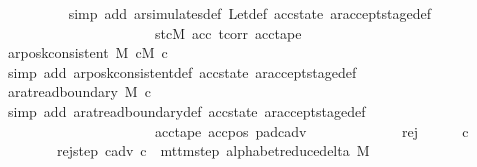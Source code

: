 \begin{isabellebody}
\ \ \ \ \ \ \ \ \isamarkupfalse%
\ {\isacharparenleft}{\kern0pt}simp\ add{\isacharcolon}{\kern0pt}\ ar{\isacharunderscore}{\kern0pt}simulates{\isacharunderscore}{\kern0pt}def\ Let{\isacharunderscore}{\kern0pt}def\ acc{\isacharunderscore}{\kern0pt}state\ ar{\isacharunderscore}{\kern0pt}accept{\isacharunderscore}{\kern0pt}stage{\isacharunderscore}{\kern0pt}def\isanewline
\ \ \ \ \ \ \ \ \ \ \ \ \ \ \ \ \ \ \ \ \ \ st{\isacharunderscore}{\kern0pt}cM{}\ acc\ tcorr{\isacharunderscore}{\kern0pt}{}\ acc{\isacharunderscore}{\kern0pt}tape{\isacharparenright}{\kern0pt}\isanewline
\ \ \ \ \ \ \isamarkupfalse%
\ {\isachardoublequoteopen}ar{\isacharunderscore}{\kern0pt}posk{\isacharunderscore}{\kern0pt}consistent\ M\ cM{\isacharunderscore}{\kern0pt}{}\ c{\isacharprime}{\kern0pt}{\isacharprime}{\kern0pt}{\isachardoublequoteclose}\isanewline
\ \ \ \ \ \ \ \ \isamarkupfalse%
\ {\isacharparenleft}{\kern0pt}simp\ add{\isacharcolon}{\kern0pt}\ ar{\isacharunderscore}{\kern0pt}posk{\isacharunderscore}{\kern0pt}consistent{\isacharunderscore}{\kern0pt}def\ acc{\isacharunderscore}{\kern0pt}state\ ar{\isacharunderscore}{\kern0pt}accept{\isacharunderscore}{\kern0pt}stage{\isacharunderscore}{\kern0pt}def{\isacharparenright}{\kern0pt}\isanewline
\ \ \ \ \ \ \isamarkupfalse%
\ {\isachardoublequoteopen}ar{\isacharunderscore}{\kern0pt}at{\isacharunderscore}{\kern0pt}read{\isacharunderscore}{\kern0pt}boundary\ M\ c{\isacharprime}{\kern0pt}{\isacharprime}{\kern0pt}{\isachardoublequoteclose}\isanewline
\ \ \ \ \ \ \ \ \isamarkupfalse%
\ {\isacharparenleft}{\kern0pt}simp\ add{\isacharcolon}{\kern0pt}\ ar{\isacharunderscore}{\kern0pt}at{\isacharunderscore}{\kern0pt}read{\isacharunderscore}{\kern0pt}boundary{\isacharunderscore}{\kern0pt}def\ acc{\isacharunderscore}{\kern0pt}state\ ar{\isacharunderscore}{\kern0pt}accept{\isacharunderscore}{\kern0pt}stage{\isacharunderscore}{\kern0pt}def\isanewline
\ \ \ \ \ \ \ \ \ \ \ \ \ \ \ \ \ \ \ \ \ \ acc{\isacharunderscore}{\kern0pt}tape\ acc{\isacharunderscore}{\kern0pt}pos\ pad{\isacharunderscore}{\kern0pt}cadv{\isacharparenright}{\kern0pt}\isanewline
\ \ \ \ \isamarkupfalse%
\isanewline
\ \ \isamarkupfalse%
\isanewline
\ \ \ \ \isamarkupfalse%
\ rej\isanewline
\ \ \ \ \isamarkupfalse%
\ c{\isacharprime}{\kern0pt}{\isacharprime}{\kern0pt}\ \isanewline
\ \ \ \ \ \ \ \ rej{\isacharunderscore}{\kern0pt}step{\isacharcolon}{\kern0pt}\ {\isachardoublequoteopen}{\isacharparenleft}{\kern0pt}c{\isacharunderscore}{\kern0pt}adv{\isacharcomma}{\kern0pt}\ c{\isacharprime}{\kern0pt}{\isacharprime}{\kern0pt}{\isacharparenright}{\kern0pt}\ {\isasymin}\ mttm{\isacharunderscore}{\kern0pt}step\ {\isacharparenleft}{\kern0pt}alphabet{\isacharunderscore}{\kern0pt}reduce{\isacharunderscore}{\kern0pt}delta\ M{\isacharparenright}{\kern0pt}{\isachardoublequoteclose}\isanewline

\end{isabellebody}
